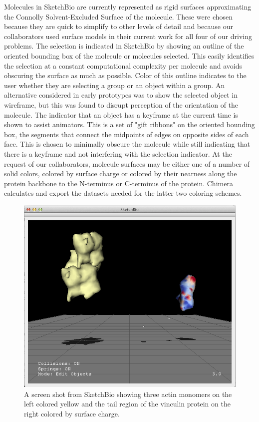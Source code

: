 \documentclass[twocolumn]{bmcart}%
\begin{document}
Molecules in SketchBio are currently represented as rigid surfaces approximating the Connolly Solvent-Excluded Surface of the molecule.
These were chosen because they are quick to simplify to other levels of detail and because our collaborators used surface models in their current work for all four of our driving problems.
The selection is indicated in SketchBio by showing an outline of the oriented bounding box of the molecule or molecules selected. 
This easily identifies the selection at a constant computational complexity per molecule and avoids obscuring the surface as much as possible.
Color of this outline indicates to the user whether they are selecting a group or an object within a group.
An alternative considered in early prototypes was to show the selected object in wireframe, but this was found to disrupt perception of the orientation of the molecule.
The indicator that an object has a keyframe at the current time is shown to assist animators.
This is a set of "gift ribbons" on the oriented bounding box, the segments that connect the midpoints of edges on opposite sides of each face.  %
This is chosen to minimally obscure the molecule while still indicating that there is a keyframe and not interfering with the selection indicator.
At the request of our collaborators, molecule surfaces may be either one of a number of solid colors, colored by surface charge or colored by their nearness along the protein backbone to the N-terminus or C-terminus of the protein. Chimera calculates and export the datasets needed for the latter two coloring schemes.

\begin{figure}[ht]
\centering
\includegraphics[width=0.9\columnwidth]{actinVinculin.png}
\caption{A screen shot from SketchBio showing three actin monomers on the left colored yellow and the tail region of the vinculin protein on the right colored by surface charge.}
\label{fig:actin_vinculin}
\end{figure}
\end{document}
